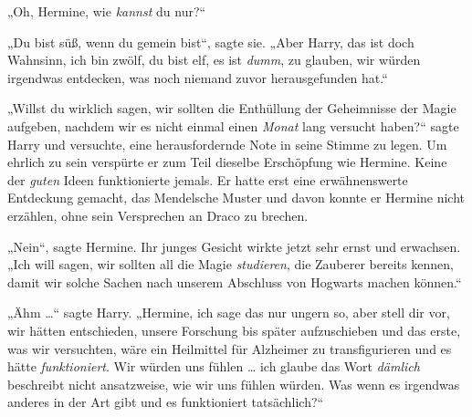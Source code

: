 „Oh, Hermine, wie \emph{kannst} du nur?“

„Du bist süß, wenn du gemein bist“, sagte sie.
„Aber Harry, das ist doch Wahnsinn, ich bin zwölf, du bist elf, es ist \emph{dumm}, zu glauben, wir würden irgendwas entdecken, was noch niemand zuvor herausgefunden hat.“

„Willst du wirklich sagen, wir sollten die Enthüllung der Geheimnisse der Magie aufgeben, nachdem wir es nicht einmal einen \emph{Monat} lang versucht haben?“ sagte Harry und versuchte, eine herausfordernde Note in seine Stimme zu legen. Um ehrlich zu sein verspürte er zum Teil dieselbe Erschöpfung wie Hermine. Keine der \emph{guten} Ideen funktionierte jemals. Er hatte erst eine erwähnenswerte Entdeckung gemacht, das Mendelsche Muster und davon konnte er Hermine nicht erzählen, ohne sein Versprechen an Draco zu brechen.

„Nein“, sagte Hermine. Ihr junges Gesicht wirkte jetzt sehr ernst und erwachsen.
„Ich will sagen, wir sollten all die Magie \emph{studieren}, die Zauberer bereits kennen, damit wir solche Sachen nach unserem Abschluss von Hogwarts machen können.“

„Ähm …“ sagte Harry.
„Hermine, ich sage das nur ungern so, aber stell dir vor, wir hätten entschieden, unsere Forschung bis später aufzuschieben und das erste, was wir versuchten, wäre ein Heilmittel für Alzheimer zu transfigurieren und es hätte \emph{funktioniert}. Wir würden uns fühlen … ich glaube das Wort \emph{dämlich} beschreibt nicht ansatzweise, wie wir uns fühlen würden. Was wenn es irgendwas anderes in der Art gibt und es funktioniert tatsächlich?“


